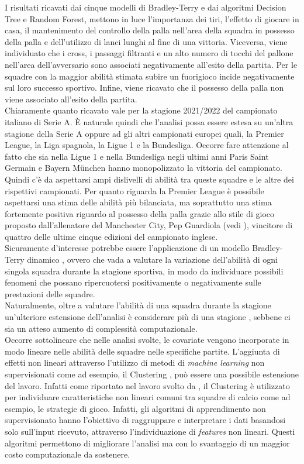 I risultati ricavati dai cinque modelli di Bradley-Terry e dai algoritmi Decision Tree e Random Forest, mettono in luce l'importanza dei tiri, l'effetto di giocare in casa, il mantenimento del controllo della palla nell'area della squadra in possesso della palla e dell'utilizzo di lanci lunghi al fine di una vittoria. Viceversa, viene individuato che i cross, i passaggi filtranti e un alto numero di tocchi del pallone nell'area dell’avversario sono associati negativamente all'esito della partita. Per le squadre con la maggior abilità stimata subire un fuorigioco incide negativamente sul loro successo sportivo. Infine, viene ricavato che il possesso della palla non viene associato all'esito della partita.\\
Chiaramente quanto ricavato vale per la stagione 2021/2022 del campionato italiano di Serie A. È naturale quindi che l'analisi possa essere estesa su un’altra stagione della Serie A oppure ad gli altri campionati europei quali, la Premier League, la Liga spagnola, la Ligue 1 e la Bundesliga. Occorre fare attenzione al fatto che sia nella Ligue 1 e nella Bundesliga negli ultimi anni Paris Saint Germain e Bayern München hanno monopolizzato la vittoria del campionato. Quindi c'è da aspettarsi ampi dislivelli di abilità tra queste squadre e le altre dei rispettivi campionati. Per quanto riguarda la Premier League è possibile aspettarsi una stima delle abilità più bilanciata, ma soprattutto una stima fortemente positiva riguardo al possesso della palla grazie allo stile di gioco proposto dall'allenatore del Manchester City, Pep Guardiola (vedi \textit{\cite{futbol}}), vincitore di quattro delle ultime cinque edizioni del campionato inglese.\\
Sicuramente d'interesse potrebbe essere l'applicazione di un modello Bradley-Terry dinamico \autocite{cattelan2013dynamic}, ovvero che vada a valutare la variazione dell'abilità di ogni singola squadra durante la stagione sportiva, in modo da individuare possibili fenomeni che possano ripercuotersi positivamente o negativamente sulle prestazioni delle squadre.\\
Naturalmente, oltre a valutare l'abilità di una squadra durante la stagione un'ulteriore estensione dell'analisi è considerare più di una stagione \autocite{tsokos2019modeling}, sebbene ci sia un atteso aumento di complessità computazionale. \\
Occorre sottolineare che nelle analisi svolte, le covariate vengono incorporate in modo lineare nelle abilità delle squadre nelle specifiche partite. L'aggiunta di effetti non lineari attraverso l'utilizzo di metodi di \emph{machine learning} non supervisionati come ad esempio, il Clustering \autocite{dunn1974well}, può essere una possibile estensione del lavoro. Infatti come riportato nel lavoro svolto da \textcite{shin2014novel}, il Clustering è utilizzato per individuare caratteristiche non lineari comuni tra squadre di calcio come ad esempio, le strategie di gioco. Infatti, gli algoritmi di apprendimento non supervisionato hanno l'obiettivo di raggruppare e interpretare i dati basandosi solo sull'input ricevuto, attraverso l'individuazione di \emph{features} non lineari. Questi algoritmi permettono di migliorare l'analisi ma con lo svantaggio di un maggior costo computazionale da sostenere.\\
